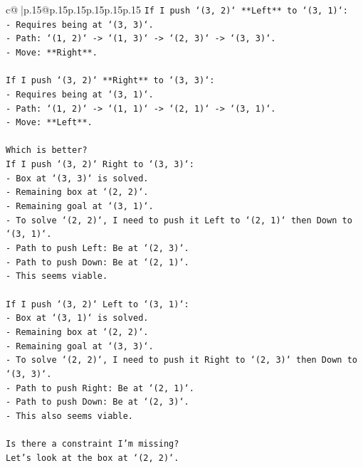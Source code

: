 \documentclass{article}
\begin{document}
{\begin{supertabular}{c@{$\;$}|p{.15\linewidth}@{}p{.15\linewidth}p{.15\linewidth}p{.15\linewidth}p{.15\linewidth}p{.15\linewidth}}
{{{\texttt{If I push `(3, 2)` **Left** to `(3, 1)`:} \\
\texttt{{-} Requires being at `(3, 3)`.} \\
\texttt{{-} Path: `(1, 2)` {-}> `(1, 3)` {-}> `(2, 3)` {-}> `(3, 3)`.} \\
\texttt{{-} Move: **Right**.} \\
\\ 
\texttt{If I push `(3, 2)` **Right** to `(3, 3)`:} \\
\texttt{{-} Requires being at `(3, 1)`.} \\
\texttt{{-} Path: `(1, 2)` {-}> `(1, 1)` {-}> `(2, 1)` {-}> `(3, 1)`.} \\
\texttt{{-} Move: **Left**.} \\
\\ 
\texttt{Which is better?} \\
\texttt{If I push `(3, 2)` Right to `(3, 3)`:} \\
\texttt{{-} Box at `(3, 3)` is solved.} \\
\texttt{{-} Remaining box at `(2, 2)`.} \\
\texttt{{-} Remaining goal at `(3, 1)`.} \\
\texttt{{-} To solve `(2, 2)`, I need to push it Left to `(2, 1)` then Down to `(3, 1)`.} \\
\texttt{{-} Path to push Left: Be at `(2, 3)`.} \\
\texttt{{-} Path to push Down: Be at `(2, 1)`.} \\
\texttt{{-} This seems viable.} \\
\\ 
\texttt{If I push `(3, 2)` Left to `(3, 1)`:} \\
\texttt{{-} Box at `(3, 1)` is solved.} \\
\texttt{{-} Remaining box at `(2, 2)`.} \\
\texttt{{-} Remaining goal at `(3, 3)`.} \\
\texttt{{-} To solve `(2, 2)`, I need to push it Right to `(2, 3)` then Down to `(3, 3)`.} \\
\texttt{{-} Path to push Right: Be at `(2, 1)`.} \\
\texttt{{-} Path to push Down: Be at `(2, 3)`.} \\
\texttt{{-} This also seems viable.} \\
\\ 
\texttt{Is there a constraint I'm missing?} \\
\texttt{Let's look at the box at `(2, 2)`.} \\
}}}
\end{supertabular}}
\end{document}
